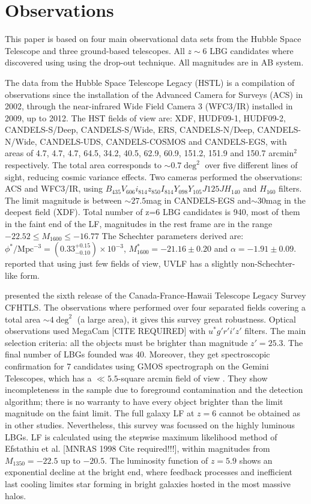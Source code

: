 \section{Observations}

This paper is based on four main observational data sets from the Hubble Space Telescope 
and three ground-based telescopes. All $z\sim 6$ LBG candidates where discovered using using 
the drop-out technique\citep{steidel03}. All magnitudes are in AB system.

The data from the Hubble Space Telescope Legacy (HSTL) \citep{bouwens14} is a compilation 
of observations since the installation of the Advanced Camera for Surveys (ACS) in 2002, 
through the near-infrared Wide Field Camera 3 (WFC3/IR) installed in 2009, up to 2012. 
The HST fields of view are: XDF, HUDF09-1, HUDF09-2, CANDELS-S/Deep, 
CANDELS-S/Wide, ERS, CANDELS-N/Deep, CANDELS-N/Wide, CANDELS-UDS, 
CANDELS-COSMOS and CANDELS-EGS, with areas of 4.7, 4.7, 4.7, 64.5, 34.2, 
40.5, 62.9, 60.9, 151.2, 151.9 and 150.7 arcmin$^2$ respectively. The total area corresponds 
to $\sim 0.7 \deg^2$ over five different lines of sight, reducing cosmic variance effects. 
Two cameras performed the observations: ACS and WFC3/IR, using 
$B_{435} V_{606} i_{814} z_{850} I_{814} Y_{098} Y_{105} J{125} JH_{140}$ and $H_{160}$ filters.
The limit magnitude is between $\sim27.5$mag in CANDELS-EGS and$\sim30 $mag in the 
deepest field (XDF). Total number of z=6 LBG candidates is 940, most of them in the faint 
end of the LF, magnitudes in the rest frame are in the range $-22.52\leq M_{1600} \leq -16.77$
The Schechter parameters derived are: $\phi^* / \textrm{Mpc}^{-3} =(0.33_{-0.10}^{+0.15}) \times 10 ^{-3}$, $M^*_{1600} = -21.16\pm 0.20$ and $\alpha = -1.91 \pm 0.09$. \citet{bouwens14} reported that using just few fields of view, UVLF has a slightly non-Schechter-like form. 

\citet{willott13} presented the sixth release of the Canada-France-Hawaii 
Telescope Legacy Survey CFHTLS. The observations where performed over four 
separated fields covering a total area $\sim 4 \deg^2$ (a large area), it gives this 
survey great robustness. Optical observations used MegaCam 
[CITE REQUIRED] with $u^* g' r' i' z'$ filters. The main selection criteria: all the 
objects must be brighter than magnitude $z' = 25.3$. The final 
number of LBGs founded was 40. Moreover, they get spectroscopic confirmation 
for 7 candidates using GMOS spectrograph on the Gemini Telescopes, which 
has a $\ll 5.5$-square arcmin field of view . They show incompleteness in the sample due to 
foreground contamination and the detection algorithm; there is no warranty to 
have every object brighter than the limit magnitude on the faint limit. The full 
galaxy LF at $z=6$ cannot be obtained as in other studies. Nevertheless, this survey 
was focussed on the highly luminous LBGs. LF is calculated using the stepwise 
maximum likelihood method of Efstathiu et al. [MNRAS 1998 Cite required!!!], within 
magnitudes 
from $M_{1350} = -22.5$ up to $-20.5$. The luminosity function of $z=5.9$ shows 
an exponential decline at the bright end, where feedback processes and inefficient 
last cooling limites star forming in bright galaxies hosted in the most massive halos.

